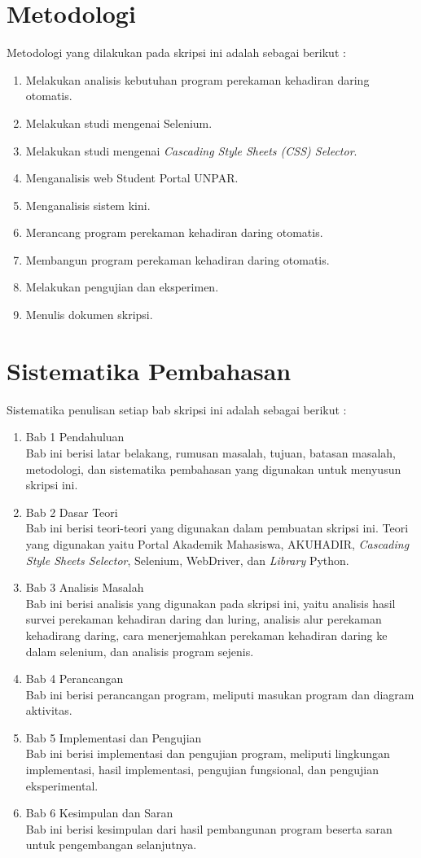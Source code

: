 \section{Metodologi}
\label{sec:metlit}
Metodologi yang dilakukan pada skripsi ini adalah sebagai berikut :
\begin{enumerate}
	\item Melakukan analisis kebutuhan program perekaman kehadiran daring otomatis.
	\item Melakukan studi mengenai Selenium.
	\item Melakukan studi mengenai \textit{Cascading Style Sheets (CSS) Selector}.
	\item Menganalisis web Student Portal UNPAR.
	\item Menganalisis sistem kini.
	\item Merancang program perekaman kehadiran daring otomatis.
	\item Membangun program perekaman kehadiran daring otomatis.
	\item Melakukan pengujian dan eksperimen.
	\item Menulis dokumen skripsi.		
\end{enumerate}


\section{Sistematika Pembahasan}
\label{sec:sispem}
Sistematika penulisan setiap bab skripsi ini adalah sebagai berikut :
\begin{enumerate}
	\item Bab 1 Pendahuluan \\
	Bab ini berisi latar belakang, rumusan masalah, tujuan, batasan masalah, metodologi, dan sistematika pembahasan yang digunakan untuk menyusun skripsi ini.
	\item Bab 2 Dasar Teori \\
	Bab ini berisi teori-teori yang digunakan dalam pembuatan skripsi ini. Teori yang digunakan yaitu Portal Akademik Mahasiswa, AKUHADIR, \textit{Cascading Style Sheets Selector}, Selenium, WebDriver, dan \textit{Library} Python.
	\item Bab 3 Analisis Masalah \\
	Bab ini berisi analisis yang digunakan pada skripsi ini, yaitu analisis hasil survei perekaman kehadiran daring dan luring, analisis alur perekaman kehadirang daring, cara menerjemahkan perekaman kehadiran daring ke dalam selenium, dan analisis program sejenis.
	\item Bab 4 Perancangan \\
	Bab ini berisi perancangan program, meliputi masukan program dan diagram aktivitas.
	\item Bab 5 Implementasi dan Pengujian\\
	Bab ini berisi implementasi dan pengujian program, meliputi lingkungan implementasi, hasil implementasi, pengujian fungsional, dan pengujian eksperimental.
	\item Bab 6 Kesimpulan dan Saran \\
	Bab ini berisi kesimpulan dari hasil pembangunan program beserta saran untuk pengembangan selanjutnya.
\end{enumerate}
